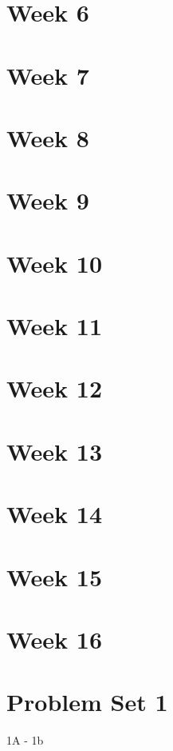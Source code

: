 \section{Week 6}
\section{Week 7}
\section{Week 8}
\section{Week 9}
\section{Week 10}
\section{Week 11}
\section{Week 12}
\section{Week 13}
\section{Week 14}
\section{Week 15}
\section{Week 16}

\section{Problem Set 1}

\begin{problem}{1A - 1b}
\end{problem}
\begin{solution}
\end{solution}
